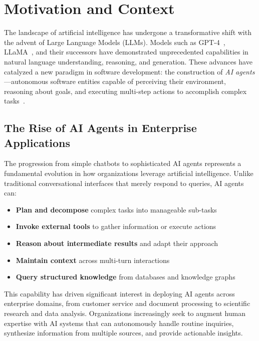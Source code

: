 \documentclass[a4paper,twoside]{sapthesis}
\begin{document}
\section{Motivation and Context}
\label{sec:motivation}

The landscape of artificial intelligence has undergone a transformative shift with the advent of Large Language Models (LLMs). Models such as GPT-4~\cite{openai2023gpt4}, LLaMA~\cite{touvron2023llama}, and their successors have demonstrated unprecedented capabilities in natural language understanding, reasoning, and generation. These advances have catalyzed a new paradigm in software development: the construction of \emph{AI agents}---autonomous software entities capable of perceiving their environment, reasoning about goals, and executing multi-step actions to accomplish complex tasks~\cite{yao2022react}.

\subsection{The Rise of AI Agents in Enterprise Applications}

The progression from simple chatbots to sophisticated AI agents represents a fundamental evolution in how organizations leverage artificial intelligence. Unlike traditional conversational interfaces that merely respond to queries, AI agents can:

\begin{itemize}
    \item \textbf{Plan and decompose} complex tasks into manageable sub-tasks
    \item \textbf{Invoke external tools} to gather information or execute actions
    \item \textbf{Reason about intermediate results} and adapt their approach
    \item \textbf{Maintain context} across multi-turn interactions
    \item \textbf{Query structured knowledge} from databases and knowledge graphs
\end{itemize}

This capability has driven significant interest in deploying AI agents across enterprise domains, from customer service and document processing to scientific research and data analysis. Organizations increasingly seek to augment human expertise with AI systems that can autonomously handle routine inquiries, synthesize information from multiple sources, and provide actionable insights.
\end{document}
